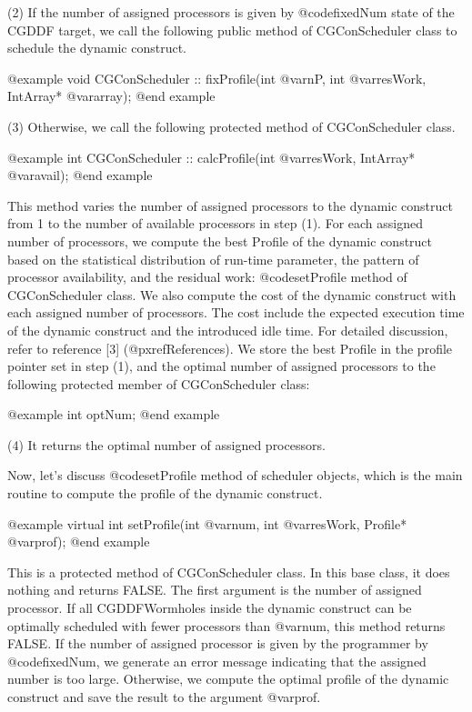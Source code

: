 {(2) If the number of assigned processors is given by @code{fixedNum} state
of the CGDDF target, we call the following public method of
CGConScheduler class to schedule the dynamic construct.

@example
void CGConScheduler :: fixProfile(int @var{nP}, int @var{resWork}, IntArray* @var{array});
@end example

(3) Otherwise, we call the following protected method of CGConScheduler class.

@example
int CGConScheduler :: calcProfile(int @var{resWork}, IntArray* @var{avail});
@end example

This method varies the number of assigned processors to the dynamic
construct from 1 to the number of available processors in step (1).
For each assigned number of processors, we compute the best Profile
of the dynamic construct based on the statistical distribution of run-time
parameter, the pattern of processor availability, and the residual work:
@code{setProfile} method of CGConScheduler class.
We also compute the cost of the dynamic construct with each assigned
number of processors. The cost include the expected execution time of the
dynamic construct and the introduced idle time. For detailed discussion,
refer to reference [3] (@pxref{References}). We store the best Profile
in the profile pointer set in step (1), and the optimal number of
assigned processors to the following protected member of CGConScheduler class:

@example
int optNum;
@end example

(4) It returns the optimal number of assigned processors.

Now, let's discuss @code{setProfile} method of scheduler objects, which is
the main routine to compute the profile of the dynamic construct.

@example
virtual int setProfile(int @var{num}, int @var{resWork}, Profile* @var{prof});
@end example

This is a protected method of CGConScheduler class. In this base class, it
does nothing and returns FALSE. The first argument is the number of assigned 
processor. If all CGDDFWormholes inside the dynamic construct can be
optimally scheduled with fewer processors than @var{num}, this method
returns FALSE. If the number of assigned processor is given by the
programmer by @code{fixedNum}, we generate an error message indicating that
the assigned number is too large. 
Otherwise, we compute the optimal profile of the dynamic construct and
save the result to the argument @var{prof}.

}
